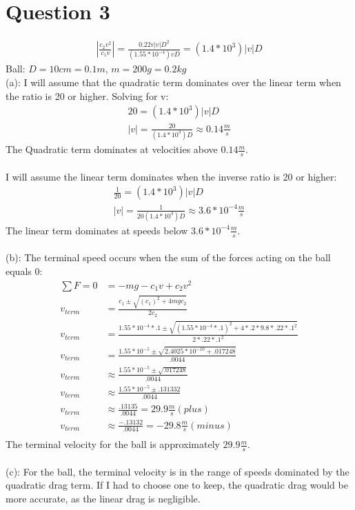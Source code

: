 \documentclass[a4paper,12pt]{article}
\begin{document}
\newpage
\section*{Question 3}
\begin{align*}
\left|\frac{c_2v^2}{c_1v}\right|=\frac{0.22v\left|v\right|D^2}{(1.55\ast10^{-4})vD}=(1.4\ast10^3)\left|v\right|D
\end{align*}
Ball: $D= 10cm = 0.1m$, $m=200g=0.2kg$\\
(a): I will assume that the quadratic term dominates over the linear term
when the ratio is 20 or higher.  Solving for v:
\begin{align*}
20=(1.4\ast10^3)\left|v\right|D\\
\left|v\right|=\frac{20}{(1.4\ast10^3)D}\approx0.14\frac{m}{s}
\end{align*}
The Quadratic term dominates at velocities above $0.14\frac{m}{s}$.
\\ \\
I will assume the linear term dominates when the inverse ratio is 20 or higher:
\begin{align*}
\frac{1}{20}=(1.4*10^3)|v|D\\
|v|=\frac{1}{20(1.4*10^3)D}\approx 3.6*10^{-4}\frac{m}{s}
\end{align*}
The linear term dominates at speeds below $3.6*10^{-4}\frac{m}{s}$.
\\ \\
(b): The terminal speed occurs when the sum of the forces acting on the ball equals 0:
\begin{align*}
\sum F = 0 &= -mg -c_1v+c_2v^2\\
v_{term}&=\frac{c_1\pm\sqrt{(c_1)^2+4mgc_2}}{2c_2}\\
v_{term}&=\frac{1.55*10^{-4}*.1\pm\sqrt{(1.55*10^{-4}*.1)^2+4*.2*9.8*.22*.1^2}}{2*.22*.1^2}\\
v_{term}&=\frac{1.55*10^{-5}\pm\sqrt{2.4025*10^{-10}+.017248}}{.0044}\\
v_{term}&\approx\frac{1.55*10^{-5}\pm\sqrt{.017248}}{.0044}\\
v_{term}&\approx\frac{1.55*10^{-5}\pm.131332}{.0044}\\
v_{term}&\approx\frac{.13135}{.0044}=29.9\frac{m}{s} (plus)\\
v_{term}&\approx\frac{-.13132}{.0044}=-29.8\frac{m}{s} (minus)\\
\end{align*}
The terminal velocity for the ball is approximately $29.9\frac{m}{s}$.
\\ \\
(c): For the ball, the terminal velocity is in the range of speeds dominated by the quadratic drag term.  If I had to choose one to keep, the quadratic drag would be more accurate, as the linear drag is negligible.
\end{document}
